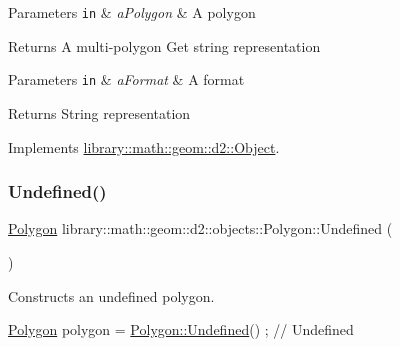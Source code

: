 \begin{DoxyParams}[1]{Parameters}
\mbox{\tt in}  & {\em a\+Polygon} & A polygon \\
\hline
\end{DoxyParams}
\begin{DoxyReturn}{Returns}
A multi-\/polygon Get string representation
\end{DoxyReturn}

\begin{DoxyParams}[1]{Parameters}
\mbox{\tt in}  & {\em a\+Format} & A format \\
\hline
\end{DoxyParams}
\begin{DoxyReturn}{Returns}
String representation 
\end{DoxyReturn}


Implements \hyperlink{classlibrary_1_1math_1_1geom_1_1d2_1_1_object_acdd76b3637732a249536b609dbe3f0eb}{library\+::math\+::geom\+::d2\+::\+Object}.

\mbox{\label{classlibrary_1_1math_1_1geom_1_1d2_1_1objects_1_1_polygon_a86e2c184f51c1e93fce5a786457b9fc3}} 
\subsubsection{\texorpdfstring{Undefined()}{Undefined()}}
{\footnotesize\ttfamily \hyperlink{classlibrary_1_1math_1_1geom_1_1d2_1_1objects_1_1_polygon}{Polygon} library\+::math\+::geom\+::d2\+::objects\+::\+Polygon\+::\+Undefined (\begin{DoxyParamCaption}{ }\end{DoxyParamCaption})\hspace{0.3cm}{\ttfamily [static]}}



Constructs an undefined polygon. 


\begin{DoxyCode}
\hyperlink{classlibrary_1_1math_1_1geom_1_1d2_1_1objects_1_1_polygon_ad2a0b0bcd5301dbcd9e2fa101fbd220b}{Polygon} polygon = \hyperlink{classlibrary_1_1math_1_1geom_1_1d2_1_1objects_1_1_polygon_a86e2c184f51c1e93fce5a786457b9fc3}{Polygon::Undefined}() ; \textcolor{comment}{// Undefined}
\end{DoxyCode}


